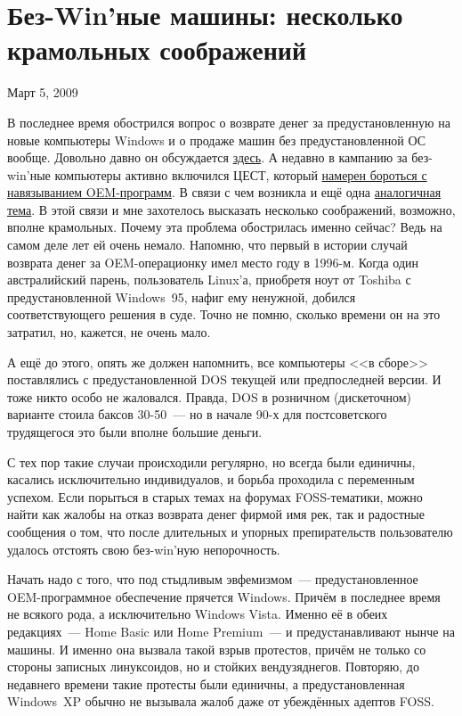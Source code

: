 \section{Без-Win’ные машины: несколько крамольных соображений}
\begin{timeline}Март 5, 2009\end{timeline}
В последнее время обострился вопрос о возврате денег за предустановленную на новые компьютеры Windows и о продаже машин без предустановленной ОС вообще. Довольно давно он обсуждается \href{http://forum.posix.ru/viewtopic.php?id=1174}{здесь}. А недавно в кампанию за без-win'ные компьютеры активно включился ЦЕСТ, который \href{http://www.centercest.ru/archive/2009/02241.return.vista/}{намерен бороться с навязыванием OEM-программ}. В связи с чем возникла и ещё одна \href{http://linuxforum.ru/index.php?showtopic=87019}{аналогичная тема}. В этой связи и мне захотелось высказать несколько соображений, возможно, вполне крамольных. Почему эта проблема обострилась именно сейчас? Ведь на самом деле лет ей очень немало. Напомню, что первый в истории случай возврата денег за OEM-операционку имел место году в 1996-м. Когда один австралийский парень, пользователь Linux'а, приобретя ноут от Toshiba с предустановленной Windows~95, нафиг ему ненужной, добился соответствующего решения в суде. Точно не помню, сколько времени он на это затратил, но, кажется, не очень мало.

А ещё до этого, опять же должен напомнить, все компьютеры <<в сборе>> поставлялись с предустановленной DOS текущей или предпоследней версии. И тоже никто особо не жаловался. Правда, DOS в розничном (дискеточном) варианте стоила баксов 30-50~--- но в начале 90-х для постсоветского трудящегося это были вполне большие деньги.

С тех пор такие случаи происходили регулярно, но всегда были единичны, касались исключительно индивидуалов, и борьба проходила с переменным успехом. Если порыться в старых темах на форумах FOSS-тематики, можно найти как жалобы на отказ возврата денег фирмой имя рек, так и радостные сообщения о том, что после длительных и упорных препирательств пользователю удалось отстоять свою без-win'ную непорочность.

Начать надо с того, что под стыдливым эвфемизмом~--- предустановленное OEM-программное обеспечение прячется Windows. Причём в последнее время не всякого рода, а исключительно Windows Vista. Именно её в обеих редакциях~--- Home Basic или Home Premium~--- и предустанавливают нынче на машины. И именно она вызвала такой взрыв протестов, причём не только со стороны записных линуксоидов, но и стойких вендузяднегов. Повторяю, до недавнего времени такие протесты были единичны, а предустановленная Windows~XP обычно не вызывала жалоб даже от убеждённых адептов FOSS.

